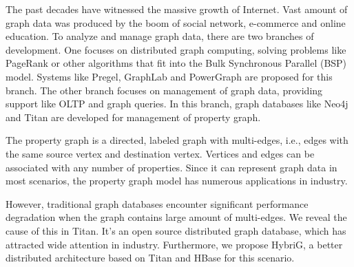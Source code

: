 \begin{eabstract}
	The past decades have witnessed the massive growth of Internet. Vast amount of graph data was produced by the boom of social network, e-commerce and online education. To analyze and manage graph data, there are two branches of development. One focuses on distributed graph computing, solving problems like PageRank or other algorithms that fit into the Bulk Synchronous Parallel (BSP) model. Systems like Pregel, GraphLab and PowerGraph are proposed for this branch. The other branch focuses on management of graph data, providing support like OLTP and graph queries. In this branch, graph databases like Neo4j and Titan are developed for management of property graph. 

	The property graph is a directed, labeled graph with multi-edges, i.e., edges with the same source vertex and destination vertex. Vertices and edges can be associated with any number of properties. Since it can represent graph data in most scenarios, the property graph model has numerous applications in industry. 

	However, traditional graph databases encounter significant performance degradation when the graph contains large amount of multi-edges. We reveal the cause of this in Titan. It’s an open source distributed graph database, which has attracted wide attention in industry. Furthermore, we propose HybriG, a better distributed architecture based on Titan and HBase for this scenario. 


\end{eabstract}
